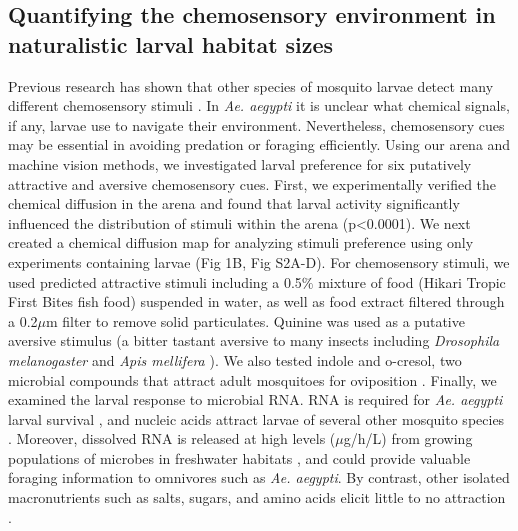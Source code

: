 \subsection*{Quantifying the chemosensory environment in naturalistic larval habitat sizes} 
\noindent Previous research has shown that other species of mosquito larvae detect many different chemosensory stimuli \cite{Xia2008-hw}. In \textit{Ae. aegypti} it is unclear what chemical signals, if any, larvae use to navigate their environment. Nevertheless, chemosensory cues may be essential in avoiding predation or foraging efficiently. Using our arena and machine vision methods, we investigated larval preference for six putatively attractive and aversive chemosensory cues. First, we experimentally verified the chemical diffusion in the arena and found that larval activity significantly influenced the distribution of stimuli within the arena (p<0.0001). We next created a chemical diffusion map for analyzing stimuli preference using only experiments containing larvae (Fig 1B, Fig S2A-D). For chemosensory stimuli, we used predicted attractive stimuli including a 0.5${\%}$ mixture of food (Hikari Tropic First Bites fish food) suspended in water, as well as food extract filtered through a 0.2${\mu}$m filter to remove solid particulates. Quinine was used as a putative aversive stimulus (a bitter tastant aversive to many insects including \textit{Drosophila melanogaster} and \textit{Apis mellifera} \cite{Rusch2017-nf,El-Keredy2012-ke}). We also tested indole and o-cresol, two microbial compounds that attract adult mosquitoes for oviposition \cite{Afify2015-fi}. Finally, we examined the larval response to microbial RNA. RNA is required for \textit{Ae. aegypti} larval survival \cite{Akov1962-gy}, and nucleic acids attract larvae of several other mosquito species \cite{Merritt1992-op}. Moreover, dissolved RNA is released at high levels (${\mu}$g/h/L) from growing populations of microbes in freshwater habitats \cite{Paul_JH_undated-lx}, and could provide valuable foraging information to omnivores such as \textit{Ae. aegypti}. By contrast, other isolated macronutrients such as salts, sugars, and amino acids elicit little to no attraction \cite{Merritt1992-op}. 

